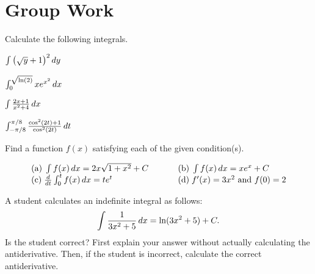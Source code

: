 \documentclass[handout,hints]{ximera}
\begin{document}
\section{Group Work}


\begin{problem}
Calculate the following integrals.


\begin{inparaenum}
\item $\int \left(\sqrt{y}+1\right)^2 \mathop{}\!d y$ \hspace{.05in}
\item $\int_0^{\sqrt{\ln(2)}} x e^{x^2} \mathop{}\!d x$ \hspace{.05in}
\item $\int \frac{2x+1}{x^2+4} \mathop{}\!d x$ \hspace{.05in}
\item $\int_{-\pi/8}^{\pi/8} \frac{\cos^2(2t) + 1}{\cos^2(2t)} \mathop{}\!d t$ 
\end{inparaenum}

\end{problem}



\begin{problem}
Find a function $f(x)$ satisfying each of the given condition(s).

$$
\begin{array}{lll}
\mathrm{(a)} \; \int f(x) \mathop{}\!d x = 2x \sqrt{1+ x^2} + C & \hspace{.2in} & \mathrm{(b)} \; \int f(x) \mathop{}\!d x = x e^x + C \\
\mathrm{(c)} \; \frac{\mathop{}\!d}{\mathop{}\!d t} \int_0^t f(x) \mathop{}\!d x = t e^t & \hspace{.2in} & \mathrm{(d)} \; f'(x) = 3x^2 \mbox{ and } f(0)=2
\end{array}
$$
\end{problem}



\begin{problem}
A student calculates an indefinite integral as follows:
$$
\int \frac{1}{3x^2 + 5} \mathop{}\!d x = \ln (3x^2 + 5) + C.
$$
Is the student correct? First explain your answer without actually calculating the antiderivative. Then, if the student is incorrect, calculate the correct antiderivative.
\end{problem}
\end{document}
